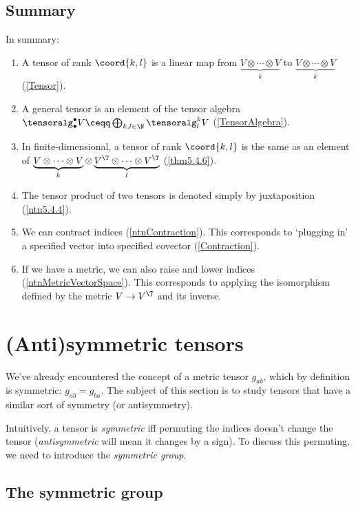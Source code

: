\subsection{Summary}

In summary:
\begin{enumerate}
	\item A tensor of rank $\coord{k,l}$ is a linear map from $\underbrace{V\otimes \cdots \otimes V}_k$ to $\underbrace{V\otimes \cdots \otimes V}_k$ (\cref{Tensor}).
	\item A general tensor is an element of the tensor algebra $\tensoralg _{\bullet}^{\bullet}V\ceqq \bigoplus _{k,l\in \N}\tensoralg _l^kV$ (\cref{TensorAlgebra}).
	\item In finite-dimensional, a tensor of rank $\coord{k,l}$ is the same as an element of $\underbrace{V\otimes \cdots \otimes V}_k\otimes \underbrace{V^{\T}\otimes \cdots \otimes V^{\T}}_l$ (\cref{thm5.4.6}).
	\item The tensor product of two tensors is denoted simply by juxtaposition (\cref{ntn5.4.4}).
	\item We can contract indices (\cref{ntnContraction}).  This corresponds to `plugging in' a specified vector into  specified covector (\cref{Contraction}).
	\item If we have a metric, we can also raise and lower indices (\cref{ntnMetricVectorSpace}).  This corresponds to applying the isomorphism defined by the metric $V\rightarrow V^{\T}$ and its inverse.
\end{enumerate}

\section{(Anti)symmetric tensors}

We've already encountered the concept of a metric tensor $g_{ab}$, which by definition is symmetric:  $g_{ab}=g_{ba}$.  The subject of this section is to study tensors that have a similar sort of symmetry (or antisymmetry).

Intuitively, a tensor is \emph{symmetric} iff permuting the indices doesn't change the tensor (\emph{antisymmetric} will mean it changes by a sign).  To discuss this permuting, we need to introduce the \emph{symmetric group}.

\subsection{The symmetric group}

